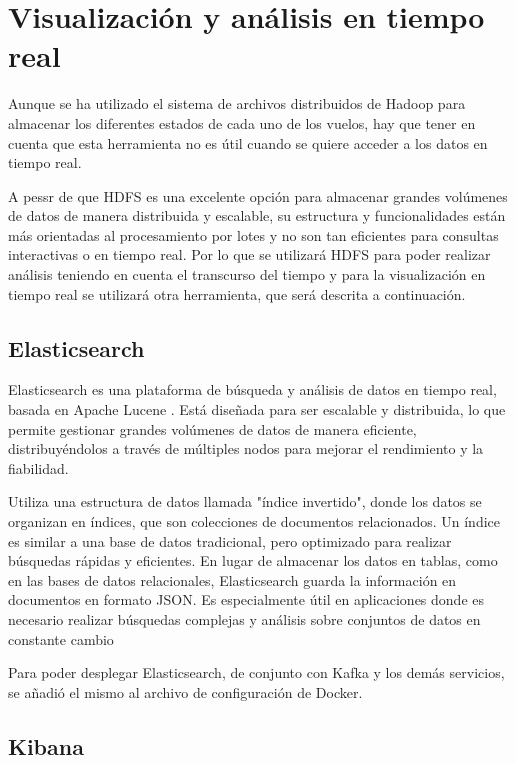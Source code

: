 \documentclass{article}
\begin{document}
\section{Visualización y análisis en tiempo real}

Aunque se ha utilizado el sistema de archivos distribuidos de Hadoop para almacenar los diferentes estados de cada uno de los vuelos, hay que tener en cuenta que esta herramienta no es útil cuando se quiere acceder a los datos en tiempo real. 

A pessr de que HDFS es una excelente opción para almacenar grandes volúmenes de datos de manera distribuida y escalable, su estructura y funcionalidades están más orientadas al procesamiento por lotes y no son tan eficientes para consultas interactivas o en tiempo real. Por lo que se utilizará HDFS para poder realizar análisis teniendo en cuenta el transcurso del tiempo y para la visualización en tiempo real se utilizará otra herramienta, que será descrita a continuación. 

\subsection{Elasticsearch}
Elasticsearch es una plataforma de búsqueda y análisis de datos en tiempo real, basada en Apache Lucene \cite{Elasticsearch}. Está diseñada para ser escalable y distribuida, lo que permite gestionar grandes volúmenes de datos de manera eficiente, distribuyéndolos a través de múltiples nodos para mejorar el rendimiento y la fiabilidad.

Utiliza una estructura de datos llamada "índice invertido", donde los datos se organizan en índices, que son colecciones de documentos relacionados. Un índice es similar a una base de datos tradicional, pero optimizado para realizar búsquedas rápidas y eficientes.
En lugar de almacenar los datos en tablas, como en las bases de datos relacionales, Elasticsearch guarda la información en documentos en formato JSON. Es especialmente útil en aplicaciones donde es necesario realizar búsquedas complejas y análisis sobre conjuntos de datos en constante cambio

Para poder desplegar Elasticsearch, de conjunto con Kafka y los demás servicios, se añadió el mismo al archivo de configuración de Docker. 

\subsection{Kibana}
\end{document}
